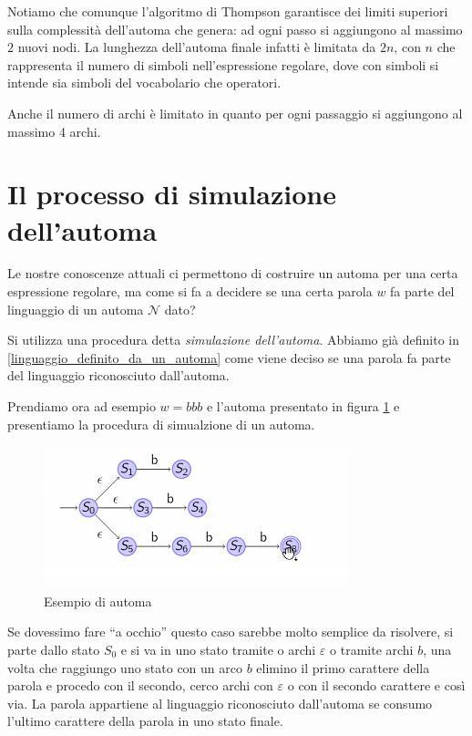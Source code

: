 \documentclass[class=book, crop=false, oneside, 12pt]{standalone}
\begin{document}
Notiamo che comunque l’algoritmo di Thompson garantisce dei limiti superiori sulla complessità dell’automa che genera: ad ogni passo si aggiungono al massimo \(2\) nuovi nodi.
La lunghezza dell’automa finale infatti è limitata da \(2n\), con \(n\) che rappresenta il numero di simboli nell’espressione regolare, dove con simboli si intende sia simboli del vocabolario che operatori.

Anche il numero di archi è limitato in quanto per ogni passaggio si aggiungono al massimo 4 archi.


\section{Il processo di simulazione dell’automa}
Le nostre conoscenze attuali ci permettono di costruire un automa per una certa espressione regolare, ma come si fa a decidere se una certa parola \(w\) fa parte del linguaggio di un automa \(\mathcal{N}\) dato?

Si utilizza una procedura detta \emph{simulazione dell’automa}.
Abbiamo già definito in \ref{linguaggio_definito_da_un_automa} come viene deciso se una parola fa parte del linguaggio riconosciuto dall’automa.

Prendiamo ora ad esempio \(w = bbb\) e l’automa presentato in figura \ref{automa_secondo_esempio} e presentiamo la procedura di simualzione di un automa.
\begin{figure}
    \centering
    \includegraphics[width=.6\textwidth,keepaspectratio]{automa_secondo_esempio}
    \caption{Esempio di automa}
    \label{automa_secondo_esempio}
\end{figure}
Se dovessimo fare “a occhio” questo caso sarebbe molto semplice da risolvere, si parte dallo stato \(S_0\) e si va in uno stato tramite o archi \(\varepsilon\) o tramite archi \(b\), una volta che raggiungo uno stato con un arco \(b\) elimino il primo carattere della parola e procedo con il secondo, cerco archi con \(\varepsilon\) o con il secondo carattere e così via.
La parola appartiene al linguaggio riconosciuto dall’automa se consumo l’ultimo carattere della parola in uno stato finale.
\end{document}
